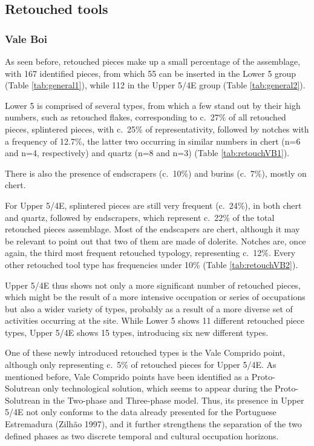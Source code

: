 \documentclass[12pt,twoside]{reedthesis}
\begin{document}
\hypertarget{retouched-tools}{%
\subsection{Retouched tools}\label{retouched-tools}}

\hypertarget{vale-boi-7}{%
\subsubsection{Vale Boi}\label{vale-boi-7}}

As seen before, retouched pieces make up a small percentage of the assemblage, with 167 identified pieces, from which 55 can be inserted in the Lower 5 group (Table \ref{tab:general1}), while 112 in the Upper 5/4E group (Table \ref{tab:general2}).

Lower 5 is comprised of several types, from which a few stand out by their high numbers, such as retouched flakes, corresponding to c.~27\% of all retouched pieces, splintered pieces, with c.~25\% of representativity, followed by notches with a frequency of 12.7\%, the latter two occurring in similar numbers in chert (n=6 and n=4, respectively) and quartz (n=8 and n=3) (Table \ref{tab:retouchVB1}).

There is also the presence of endscrapers (c.~10\%) and burins (c.~7\%), mostly on chert.

For Upper 5/4E, splintered pieces are still very frequent (c.~24\%), in both chert and quartz, followed by endscrapers, which represent c.~22\% of the total retouched pieces assemblage. Most of the endscapers are chert, although it may be relevant to point out that two of them are made of dolerite. Notches are, once again, the third most frequent retouched typology, representing c.~12\%. Every other retouched tool type has frequencies under 10\% (Table \ref{tab:retouchVB2}).

Upper 5/4E thus shows not only a more significant number of retouched pieces, which might be the result of a more intensive occupation or series of occupations but also a wider variety of types, probably as a result of a more diverse set of activities occurring at the site. While Lower 5 shows 11 different retouched piece types, Upper 5/4E shows 15 types, introducing six new different types.

One of these newly introduced retouched types is the Vale Comprido point, although only representing c.~5\% of retouched pieces for Upper 5/4E. As mentioned before, Vale Comprido points have been identified as a Proto-Solutrean only technological solution, which seems to appear during the Proto-Solutrean in the Two-phase and Three-phase model. Thus, its presence in Upper 5/4E not only conforms to the data already presented for the Portuguese Estremadura (Zilhão 1997), and it further strengthens the separation of the two defined phases as two discrete temporal and cultural occupation horizons.
\end{document}
